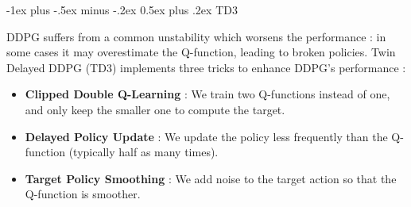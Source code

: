 \documentclass[10pt,landscape]{article}
\makeatletter
\renewcommand{\section}{\@startsection{section}{1}{0mm}%
                                {-1ex plus -.5ex minus -.2ex}%
                                {0.5ex plus .2ex}%
                                {\normalfont\large\bfseries}}
\makeatother
\begin{document}
\begin{multicols}{3}


\section{TD3}

DDPG suffers from a common unstability which worsens the performance : in some cases it may overestimate the Q-function, leading to broken policies. Twin Delayed DDPG (TD3) implements three tricks to enhance DDPG's performance :

\begin{itemize}[leftmargin=*]
    \item \textbf{Clipped Double Q-Learning} : We train two Q-functions instead of one, and only keep the smaller one to compute the target.
    \item \textbf{Delayed Policy Update} : We update the policy less frequently than the Q-function (typically half as many times).
    \item\textbf{Target Policy Smoothing} : We add noise to the target action so that the Q-function is smoother.
\end{itemize}



\end{multicols}
\end{document}

